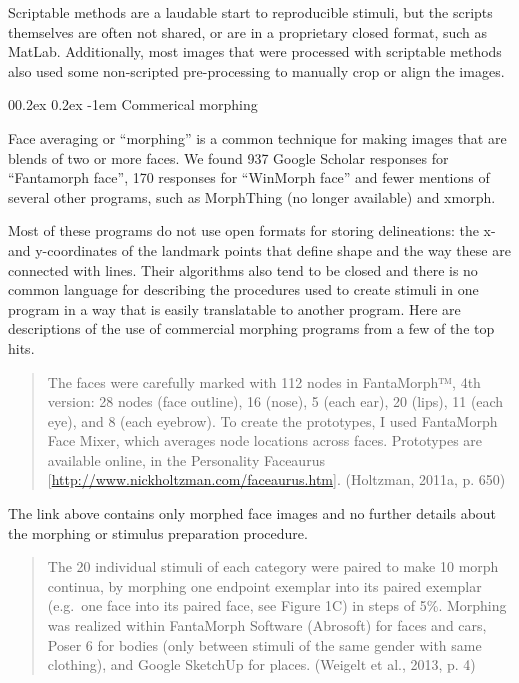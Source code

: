 \documentclass[
  doc,floatsintext]{apa6}
\makeatletter
\let\oldparagraph\paragraph
\renewcommand{\paragraph}[1]{\oldparagraph{#1}\mbox{}}
\renewcommand{\paragraph}{\@startsection{paragraph}{4}{\parindent}%
  {0\baselineskip \@plus 0.2ex \@minus 0.2ex}%
  {-1em}%
  {\normalfont\normalsize\bfseries\itshape\typesectitle}}
\makeatother
\begin{document}
Scriptable methods are a laudable start to reproducible stimuli, but the scripts themselves are often not shared, or are in a proprietary closed format, such as MatLab. Additionally, most images that were processed with scriptable methods also used some non-scripted pre-processing to manually crop or align the images.

\hypertarget{commerical-morphing}{%
\paragraph{Commerical morphing}\label{commerical-morphing}}

Face averaging or ``morphing'' is a common technique for making images that are blends of two or more faces. We found 937 Google Scholar responses for ``Fantamorph face'', 170 responses for ``WinMorph face'' and fewer mentions of several other programs, such as MorphThing (no longer available) and xmorph.

Most of these programs do not use open formats for storing delineations: the x- and y-coordinates of the landmark points that define shape and the way these are connected with lines. Their algorithms also tend to be closed and there is no common language for describing the procedures used to create stimuli in one program in a way that is easily translatable to another program. Here are descriptions of the use of commercial morphing programs from a few of the top hits.

\begin{quote}
The faces were carefully marked with 112 nodes in FantaMorph™, 4th version: 28 nodes (face outline), 16 (nose), 5 (each ear), 20 (lips), 11 (each eye), and 8 (each eyebrow). To create the prototypes, I used FantaMorph Face Mixer, which averages node locations across faces. Prototypes are available online, in the Personality Faceaurus {[}\url{http://www.nickholtzman.com/faceaurus.htm}{]}. (Holtzman, 2011a, p. 650)
\end{quote}

The link above contains only morphed face images and no further details about the morphing or stimulus preparation procedure.

\begin{quote}
The 20 individual stimuli of each category were paired to make 10 morph continua, by morphing one endpoint exemplar into its paired exemplar (e.g.~one face into its paired face, see Figure 1C) in steps of 5\%. Morphing was realized within FantaMorph Software (Abrosoft) for faces and cars, Poser 6 for bodies (only between stimuli of the same gender with same clothing), and Google SketchUp for places. (Weigelt et al., 2013, p. 4)
\end{quote}
\end{document}
